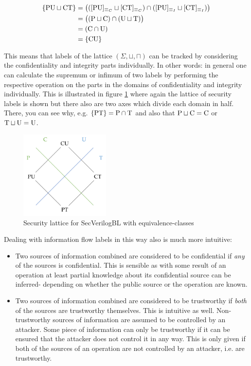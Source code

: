 \begin{example}
    \begin{align*}
        \{ \text{PU} \sqcup \text{CT} \} &= \big(([\text{PU}]_{\equiv_C} \sqcup [\text{CT}]_{\equiv_C}) \cap ([\text{PU}]_{\equiv_I} \sqcup [\text{CT}]_{\equiv_I}) \big) \\
        &= \big((\text{P} \sqcup \text{C}) \cap (\text{U} \sqcup \text{T}) \big) \\
        &= (\text{C} \cap \text{U}) \\
        &= \{ \text{CU} \}
    \end{align*}
\end{example}

This means that labels of the lattice $ (\Sigma, \sqcup, \sqcap) $ can be tracked by considering the confidentiality and integrity parts individually.
In other words: in general one can calculate the supremum or infimum of two labels by performing the respective operation on the parts in the domains of confidentiality and integrity individually.
This is illustrated in figure \ref{fig:lattice-equiv-classes} where again the lattice of security labels is shown but there also are two axes which divide each domain in half.
There, you can see why, e.g. $ \{ \text{PT} \} = \text{P} \cap \text{T} $ and also that $ \text{P} \sqcup \text{C} = \text{C} $ or $ \text{T} \sqcup \text{U} = \text{U} $.

\begin{figure}
    \centering
    \includegraphics[width=0.4\textwidth]{figures/equivalence-class-lattice.png}
    \caption{Security lattice for SecVerilogBL \cite{Ferraiuolo17} with equivalence-classes}
    \label{fig:lattice-equiv-classes}
\end{figure}

Dealing with information flow labels in this way also is much more intuitive:
\begin{itemize}
    \item Two sources of information combined are considered to be confidential if \textit{any} of the sources is confidential.
    This is sensible as with some result of an operation at least partial knowledge about its confidential source can be inferred- depending on whether the public source or the operation are known.
    \item Two sources of information combined are considered to be trustworthy if \textit{both} of the sources are trustworthy themselves.
    This is intuitive as well.
    Non-trustworthy sources of information are assumed to be controlled by an attacker.
    Some piece of information can only be trustworthy if it can be ensured that the attacker does not control it in any way.
    This is only given if both of the sources of an operation are not controlled by an attacker, i.e. are trustworthy.
\end{itemize}

